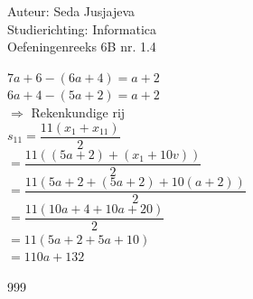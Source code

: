 \documentclass[a4paper]{article}
\begin{document}
\noindent \large Auteur: Seda Jusjajeva\\
\noindent \large Studierichting: Informatica\\
\noindent \large Oefeningenreeks 6B nr. 1.4\\

\medskip

\normalsize


$7a + 6 - (6a + 4) = a + 2$ \\

$6a + 4 - (5a + 2) = a + 2$ \\

$\Rightarrow$ Rekenkundige rij \\

$s_{11} = \dfrac{11(x_1 + x_{11})}{2}$ \\

$= \dfrac{11((5a + 2) + (x_1 + 10v))}{2}$ \\

$= \dfrac{11(5a + 2 + (5a + 2) + 10(a + 2))}{2}$ \\

$= \dfrac{11(10a + 4 + 10a + 20)}{2}$ \\

$= 11(5a + 2 + 5a + 10)$ \\

$= 110a + 132$ \\





\begin{thebibliography}{999}
\end{thebibliography}
\end{document}
